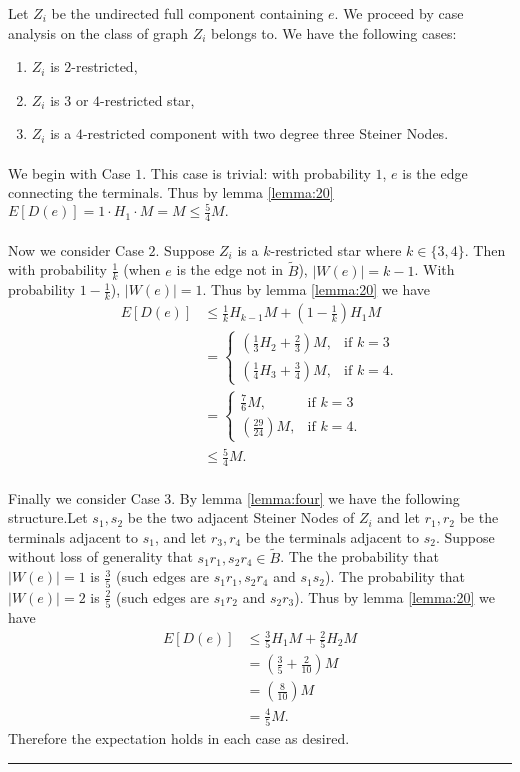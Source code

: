 \documentclass[letterpaper,12pt,oneside,onecolumn]{article}
\newenvironment{proof}{{\bf Proof:  }}{\hfill\rule{2mm}{2mm}}
\begin{document}
\begin{proof}
Let $Z_i$ be the undirected full component containing $e$. We proceed by case analysis on the class of graph $Z_i$ belongs to. We have the following cases:
\begin{enumerate}
\item $Z_i$ is $2$-restricted,
\item $Z_i$ is $3$ or $4$-restricted star,
\item $Z_i$ is a $4$-restricted component with two degree three Steiner Nodes.
\end{enumerate}
\paragraph{}
We begin with Case $1$. This case is trivial: with probability $1$, $e$ is the edge connecting the terminals. Thus by lemma \ref{lemma:20} $E[D(e)] = 1\cdot H_1 \cdot M = M \leq \frac{5}{4} M.$
\paragraph{}
Now we consider Case $2$. Suppose $Z_i$ is a $k$-restricted star where $k \in \{3,4\}$. Then with probability $\frac{1}{k}$ (when $e$ is the edge not in $\tilde{B}$), $|W(e)| = k-1$. With probability $1-\frac{1}{k}$), $|W(e)| = 1$. Thus by lemma \ref{lemma:20} we have
\begin{align*}E[D(e)] &\leq \frac{1}{k} H_{k-1} M + (1-\frac{1}{k})H_1 M
\\&=\begin{cases}
(\frac{1}{3}H_2 + \frac{2}{3})M, &\text{if $k = 3$} \\
(\frac{1}{4}H_3 + \frac{3}{4})M, &\text{if $k=4$}.
\end{cases} \\
&=\begin{cases}
\frac{7}{6}M, &\text{if $k = 3$} \\
(\frac{29}{24})M, &\text{if $k=4$}.
\end{cases} \\
&\leq \frac{5}{4} M.
\end{align*}
\paragraph{}
Finally we consider Case $3$. By lemma \ref{lemma:four} we have the following structure.Let $s_1,s_2$ be the two adjacent Steiner Nodes of $Z_i$ and let $r_1,r_2$ be the terminals adjacent to $s_1$, and let $r_3,r_4$ be the terminals adjacent to $s_2$. Suppose without loss of generality that $s_1r_1, s_2r_4 \in \tilde{B}$. The the probability that $|W(e)| = 1$ is $\frac{3}{5}$ (such edges are $s_1r_1, s_2r_4$ and $s_1s_2$). The probability that $|W(e)| = 2$ is $\frac{2}{5}$ (such edges are $s_1r_2$ and $s_2r_3$). Thus by lemma \ref{lemma:20} we have
\begin{align*}
E[D(e)] &\leq \frac{3}{5}H_1M + \frac{2}{5}H_2M \\
&= (\frac{3}{5} + \frac{2}{10}) M \\
&= (\frac{8}{10})M \\
&= \frac{4}{5}M.
\end{align*} 
Therefore the expectation holds in each case as desired.
\end{proof}
\end{document}
